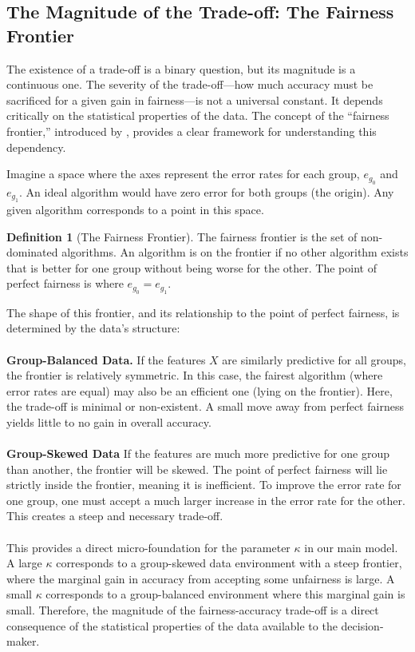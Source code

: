 \documentclass[12pt,a4paper]{article}
\theoremstyle{definition}
\newtheorem{definition}{Definition}
\theoremstyle{remark}
\begin{document}
\subsection{The Magnitude of the Trade-off: The Fairness Frontier}

The existence of a trade-off is a binary question, but its magnitude is a continuous one. The severity of the trade-off—how much accuracy must be sacrificed for a given gain in fairness—is not a universal constant. It depends critically on the statistical properties of the data. The concept of the ``fairness frontier,'' introduced by \citet{Liang2025}, provides a clear framework for understanding this dependency.

Imagine a space where the axes represent the error rates for each group, $e_{g_0}$ and $e_{g_1}$. An ideal algorithm would have zero error for both groups (the origin). Any given algorithm corresponds to a point in this space.

\begin{definition}[The Fairness Frontier]
The fairness frontier is the set of non-dominated algorithms. An algorithm is on the frontier if no other algorithm exists that is better for one group without being worse for the other. The point of perfect fairness is where $e_{g_0} = e_{g_1}$.
\end{definition}

The shape of this frontier, and its relationship to the point of perfect fairness, is determined by the data's structure:
\\ \\ \textbf{Group-Balanced Data.} If the features $X$ are similarly predictive for all groups, the frontier is relatively symmetric. In this case, the fairest algorithm (where error rates are equal) may also be an efficient one (lying on the frontier). Here, the trade-off is minimal or non-existent. A small move away from perfect fairness yields little to no gain in overall accuracy.
\\ \\ \textbf{Group-Skewed Data} If the features are much more predictive for one group than another, the frontier will be skewed. The point of perfect fairness will lie strictly inside the frontier, meaning it is inefficient. To improve the error rate for one group, one must accept a much larger increase in the error rate for the other. This creates a steep and necessary trade-off.
\\ \\
This provides a direct micro-foundation for the parameter $\kappa$ in our main model. A large $\kappa$ corresponds to a group-skewed data environment with a steep frontier, where the marginal gain in accuracy from accepting some unfairness is large. A small $\kappa$ corresponds to a group-balanced environment where this marginal gain is small. Therefore, the magnitude of the fairness-accuracy trade-off is a direct consequence of the statistical properties of the data available to the decision-maker.
\end{document}
